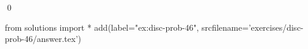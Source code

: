 
\begin{ex} 
  \label{ex:disc-prob-46}
  
  \qed
\end{ex} 
\begin{python0}
from solutions import *
add(label="ex:disc-prob-46",
    srcfilename='exercises/disc-prob-46/answer.tex') 
\end{python0}
